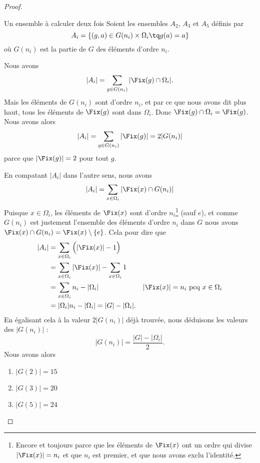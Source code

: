 \begin{proof}
\begin{subproof}
		\item[Un ensemble à calculer deux fois]
		Soient les ensembles \( A_2\), \( A_3\) et \( A_5\) définis par
		\begin{equation}
			A_i=\{ (g,a)\in G(n_i)\times \Omega_i\tq g(a)=a  \}
		\end{equation}
		où \( G(n_i)\) est la partie de \( G\) des éléments d'ordre \( n_i\).

		Nous avons
		\begin{equation}
			| A_i |=\sum_{g\in G(n_i)}| \Fix(g)\cap \Omega_i |.
		\end{equation}
		Mais les éléments de \( G(n_i)\) sont d'ordre \( n_i\), et par ce que nous avons dit plus haut, tous les éléments de \( \Fix(g)\) sont dans \( \Omega_i\). Donc \( \Fix(g)\cap \Omega_i=\Fix(g)\). Nous avons alors
		\begin{equation}
			| A_i |=\sum_{g\in G(n_i)}| \Fix(g) |=2|G(n_i)|
		\end{equation}
		parce que \( | \Fix(g) |=2\) pour tout \( g\).

		En compatant \( | A_i |\) dans l'autre sens, nous avons
		\begin{equation}        \label{EQooBHIIooVcGgFd}
			| A_i |=\sum_{x\in \Omega_i}|  \Fix(x)\cap G(n_i) |
		\end{equation}
		Puisque \( x\in \Omega_i\), les éléments de \( \Fix(x)\) sont d'ordre \( n_i\)\footnote{Encore et toujours parce que les éléments de \( \Fix(x)\) ont un ordre qui divise \( | \Fix(x) |=n_i\) et que \( n_i\) est premier, et que nous avons exclu l'identité.} (sauf \( e\)), et comme \( G(n_i)\) est justement l'ensemble des éléments d'ordre \( n_i\) dans \( G\) nous avons \( \Fix(x)\cap G(n_i) = \Fix(x)\setminus\{ e \}\). Cela pour dire que
		\begin{subequations}
			\begin{align}
				| A_i | & =\sum_{x\in \Omega_i}\Big( |\Fix(x)|-1\Big)                                                       \\
				        & =\sum_{x\in \Omega_i}| \Fix(x) |-\sum_{x\in \Omega_i}1                                            \\
				        & =\sum_{x\in \Omega_i}n_i-| \Omega_i |                  & | \Fix(x) |=n_i \text{ pcq }x\in\Omega_i \\
				        & =| \Omega_i |n_i-| \Omega_i |=| G |-| \Omega_i |.
			\end{align}
		\end{subequations}
		En égalisant cela à la valeur \( 2|G(n_i)|\) déjà trouvée, nous déduisons les valeurs des \( | G(n_i) |\) :
		\begin{equation}
			| G(n_i) |=\frac{ | G |-| \Omega_i | }{2}.
		\end{equation}
		Nous avons alors
		\begin{enumerate}
			\item
			      \( | G(2) |=15\)
			\item
			      \( | G(3) |=20\)
			\item
			      \( | G(5) |=24\)
		\end{enumerate}


\end{subproof}
\end{proof}
